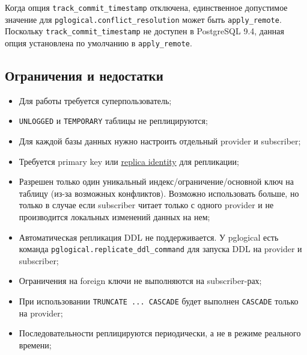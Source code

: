 Когда опция \lstinline!track_commit_timestamp! отключена, единственное допустимое значение для \lstinline!pglogical.conflict_resolution! может быть \lstinline!apply_remote!. Поскольку \lstinline!track_commit_timestamp! не доступен в PostgreSQL 9.4, данная опция установлена по умолчанию в \lstinline!apply_remote!.



\subsection{Ограничения и недостатки}

\begin{itemize}
  \item Для работы требуется суперпользователь;
  \item \lstinline!UNLOGGED! и \lstinline!TEMPORARY! таблицы не реплицируются;
  \item Для каждой базы данных нужно настроить отдельный provider и subscriber;
  \item Требуется primary key или \href{http://www.postgresql.org/docs/current/static/sql-altertable.html#SQL-CREATETABLE-REPLICA-IDENTITY}{replica identity} для репликации;
  \item Разрешен только один уникальный индекс/ограничение/основной ключ на таблицу (из-за возможных конфликтов). Возможно использовать больше, но только в случае если subscriber читает только с одного provider и не производится локальных изменений данных на нем;
  \item Автоматическая репликация DDL не поддерживается. У pglogical есть команда \lstinline!pglogical.replicate_ddl_command! для запуска DDL на provider и subscriber;
  \item Ограничения на foreign ключи не выполняются на subscriber-рах;
  \item При использовании \lstinline!TRUNCATE ... CASCADE! будет выполнен \lstinline!CASCADE! только на provider;
  \item Последовательности реплицируются периодически, а не в режиме реального времени;
\end{itemize}
